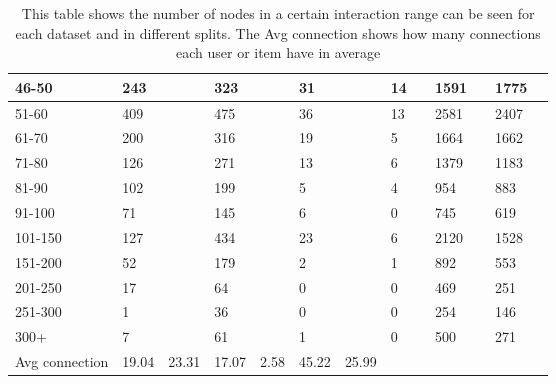 \begin{table*}[]
\begin{tabular}{|l|l|l|l|l|l|l|l|l|l|l|l|l|}
    46-50   & 243          &             & 323          &             & 31           &             & 14           &             & 1591          &            & 1775           &          \\ \hline
    51-60   & 409          &             & 475          &             & 36           &             & 13           &             & 2581          &            & 2407           &          \\ \hline
    61-70   & 200          &             & 316          &             & 19           &             & 5            &             & 1664          &            & 1662           &          \\ \hline
    71-80   & 126          &             & 271          &             & 13           &             & 6            &             & 1379          &            & 1183           &          \\ \hline
    81-90   & 102          &             & 199          &             & 5            &             & 4            &             & 954           &            & 883            &          \\ \hline
    91-100  & 71           &             & 145          &             & 6            &             & 0            &             & 745           &            & 619            &          \\ \hline
    101-150 & 127          &             & 434          &             & 23           &             & 6            &             & 2120          &            & 1528           &          \\ \hline
    151-200 & 52           &             & 179          &             & 2            &             & 1            &             & 892           &            & 553            &          \\ \hline
    201-250 & 17           &             & 64           &             & 0            &             & 0            &             & 469           &            & 251            &          \\ \hline
    251-300 & 1            &             & 36           &             & 0            &             & 0            &             & 254           &            & 146            &          \\ \hline
    300+    & 7            &             & 61           &             & 1            &             & 0            &             & 500           &            & 271            &          \\ \hline
Avg connection & 19.04         & 23.31         & 17.07              & 2.58             & 45.22           & 25.99          \\ \hline
    \end{tabular}
    \caption{This table shows the number of nodes in a certain interaction range can be seen for each dataset and in different splits. The Avg connection shows how many connections each user or item have in average} %
    \label{tab:dataset-item-and-user-splits}
\end{table*}